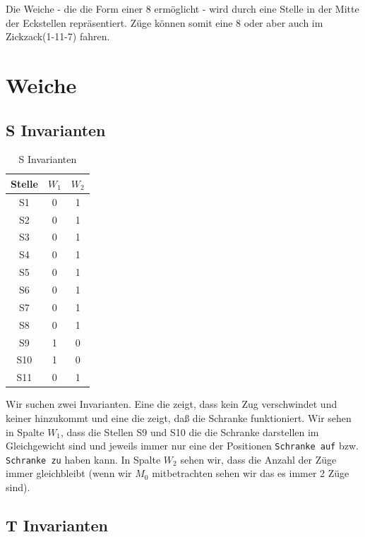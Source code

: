 \documentclass[10pt]{scrartcl}
\begin{document}
Die Weiche - die die Form einer 8 ermöglicht - wird durch eine Stelle in der Mitte der Eckstellen repräsentiert. Züge können somit eine 8 oder aber auch \glqq{}im Zickzack\grqq (1-11-7) fahren.

\section{Weiche}
		
		\subsection{S Invarianten}
	
			
\begin{table}[H]
\centering		
		\begin{tabular}{|c|c|c|}
\hline Stelle  & $W_1$ & $W_2$ \\ 
\hline S1 & 0 & 1 \\ 
\hline S2 & 0 & 1 \\ 
\hline S3 & 0 & 1 \\ 
\hline S4 & 0 & 1 \\ 
\hline S5 & 0 & 1 \\ 
\hline S6 & 0 & 1 \\ 
\hline S7 & 0 & 1 \\ 
\hline S8 & 0 & 1 \\ 
\hline S9 & 1 & 0 \\ 
\hline S10 & 1  & 0 \\ 
\hline S11 & 0 & 1 \\
\hline 
\end{tabular}
\caption{S Invarianten}
\end{table}
Wir suchen zwei Invarianten. Eine die zeigt, dass kein Zug verschwindet und keiner hinzukommt und eine die zeigt, daß die Schranke funktioniert. 
Wir sehen in Spalte $W_1$, dass die Stellen S9 und S10 die die Schranke darstellen im Gleichgewicht sind und jeweils immer nur eine der Positionen \verb!Schranke auf! bzw. \verb!Schranke zu! haben kann.  
In Spalte $W_2$ sehen wir, dass die Anzahl der Züge immer gleichbleibt (wenn wir $M_0$ mitbetrachten sehen wir das es immer 2 Züge sind). 

\subsection{T Invarianten}
\end{document}
